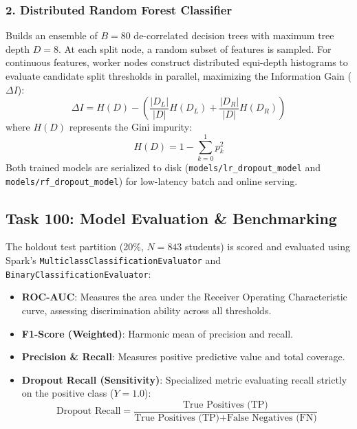 \documentclass[11pt,a4paper]{article}
\begin{document}
\subsubsection{2. Distributed Random Forest Classifier}
Builds an ensemble of $B=80$ de-correlated decision trees with maximum tree depth $D=8$. 
At each split node, a random subset of features is sampled. For continuous features, worker nodes construct distributed equi-depth histograms to evaluate candidate split thresholds in parallel, maximizing the Information Gain ($\Delta I$):
\begin{equation}
    \Delta I = H(D) - \left( \frac{|D_L|}{|D|} H(D_L) + \frac{|D_R|}{|D|} H(D_R) \right)
\end{equation}
where $H(D)$ represents the Gini impurity:
\begin{equation}
    H(D) = 1 - \sum_{k=0}^1 p_k^2
\end{equation}
Both trained models are serialized to disk (\texttt{models/lr\_dropout\_model} and \texttt{models/rf\_dropout\_model}) for low-latency batch and online serving.

\subsection{Task 100: Model Evaluation \& Benchmarking}
The holdout test partition (20\%, $N=843$ students) is scored and evaluated using Spark's \texttt{MulticlassClassificationEvaluator} and \texttt{BinaryClassificationEvaluator}:
\begin{itemize}
    \item \textbf{ROC-AUC}: Measures the area under the Receiver Operating Characteristic curve, assessing discrimination ability across all thresholds.
    \item \textbf{F1-Score (Weighted)}: Harmonic mean of precision and recall.
    \item \textbf{Precision \& Recall}: Measures positive predictive value and total coverage.
    \item \textbf{Dropout Recall (Sensitivity)}: Specialized metric evaluating recall strictly on the positive class ($Y=1.0$):
    \begin{equation}
        \text{Dropout Recall} = \frac{\text{True Positives (TP)}}{\text{True Positives (TP)} + \text{False Negatives (FN)}}
    \end{equation}
\end{itemize}
\end{document}
